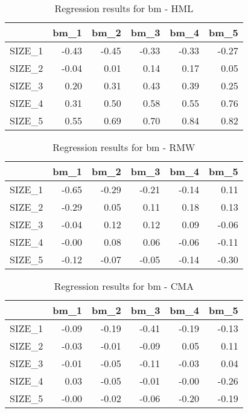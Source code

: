 \begin{table}[ht]
\centering
\caption{Regression results for bm - HML} 
\begin{tabular}{rrrrrr}
  \hline
 & bm\_1 & bm\_2 & bm\_3 & bm\_4 & bm\_5 \\ 
  \hline
SIZE\_1 & -0.43 & -0.45 & -0.33 & -0.33 & -0.27 \\ 
  SIZE\_2 & -0.04 & 0.01 & 0.14 & 0.17 & 0.05 \\ 
  SIZE\_3 & 0.20 & 0.31 & 0.43 & 0.39 & 0.25 \\ 
  SIZE\_4 & 0.31 & 0.50 & 0.58 & 0.55 & 0.76 \\ 
  SIZE\_5 & 0.55 & 0.69 & 0.70 & 0.84 & 0.82 \\ 
   \hline
\end{tabular}
\end{table}


\begin{table}[ht]
\centering
\caption{Regression results for bm - RMW} 
\begin{tabular}{rrrrrr}
  \hline
 & bm\_1 & bm\_2 & bm\_3 & bm\_4 & bm\_5 \\ 
  \hline
SIZE\_1 & -0.65 & -0.29 & -0.21 & -0.14 & 0.11 \\ 
  SIZE\_2 & -0.29 & 0.05 & 0.11 & 0.18 & 0.13 \\ 
  SIZE\_3 & -0.04 & 0.12 & 0.12 & 0.09 & -0.06 \\ 
  SIZE\_4 & -0.00 & 0.08 & 0.06 & -0.06 & -0.11 \\ 
  SIZE\_5 & -0.12 & -0.07 & -0.05 & -0.14 & -0.30 \\ 
   \hline
\end{tabular}
\end{table}


\begin{table}[ht]
\centering
\caption{Regression results for bm - CMA} 
\begin{tabular}{rrrrrr}
  \hline
 & bm\_1 & bm\_2 & bm\_3 & bm\_4 & bm\_5 \\ 
  \hline
SIZE\_1 & -0.09 & -0.19 & -0.41 & -0.19 & -0.13 \\ 
  SIZE\_2 & -0.03 & -0.01 & -0.09 & 0.05 & 0.11 \\ 
  SIZE\_3 & -0.01 & -0.05 & -0.11 & -0.03 & 0.04 \\ 
  SIZE\_4 & 0.03 & -0.05 & -0.01 & -0.00 & -0.26 \\ 
  SIZE\_5 & -0.00 & -0.02 & -0.06 & -0.20 & -0.19 \\ 
   \hline
\end{tabular}
\end{table}



